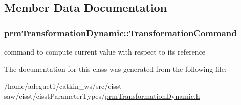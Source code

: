 \subsection{Member Data Documentation}
\hypertarget{classprm_transformation_dynamic_a09131f273e7dd6388d357b6830ff5069}{
\subsubsection[{Transformation\-Command}]{ prm\-Transformation\-Dynamic\-::\-Transformation\-Command\hspace{0.3cm}{\ttfamily [protected]}}}\label{classprm_transformation_dynamic_a09131f273e7dd6388d357b6830ff5069}
command to compute current value with respect to its reference 

The documentation for this class was generated from the following file\-:\begin{DoxyCompactItemize}
\item 
/home/adeguet1/catkin\-\_\-ws/src/cisst-\/saw/cisst/cisst\-Parameter\-Types/\hyperlink{prm_transformation_dynamic_8h}{prm\-Transformation\-Dynamic.\-h}\end{DoxyCompactItemize}
